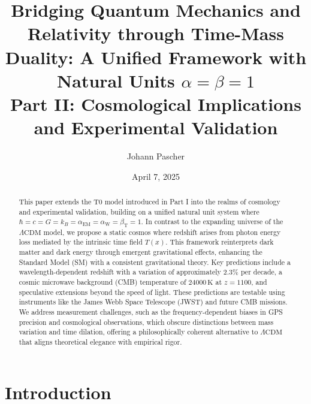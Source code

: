 \documentclass[twocolumn,aps,prl]{revtex4-2}
\newcommand{\Tfield}{T(x)}
\newcommand{\alphaEM}{\alpha_{\text{EM}}}
\newcommand{\alphaW}{\alpha_{\text{W}}}
\newcommand{\betaT}{\beta_{\text{T}}}
\newcommand{\LCDM}{\Lambda\text{CDM}}
\begin{document}
	
	\title{Bridging Quantum Mechanics and Relativity through Time-Mass Duality: A Unified Framework with Natural Units \(\alpha = \beta = 1\) \\ Part II: Cosmological Implications and Experimental Validation}
	\author{Johann Pascher}
	\date{April 7, 2025}
	
	\begin{abstract}
		This paper extends the T0 model introduced in Part I into the realms of cosmology and experimental validation, building on a unified natural unit system where \(\hbar = c = G = k_B = \alphaEM = \alphaW = \betaT = 1\). In contrast to the expanding universe of the \(\LCDM\) model, we propose a static cosmos where redshift arises from photon energy loss mediated by the intrinsic time field \(\Tfield\). This framework reinterprets dark matter and dark energy through emergent gravitational effects, enhancing the Standard Model (SM) with a consistent gravitational theory. Key predictions include a wavelength-dependent redshift with a variation of approximately \(2.3\%\) per decade, a cosmic microwave background (CMB) temperature of \(24000 \, \text{K}\) at \(z = 1100\), and speculative extensions beyond the speed of light. These predictions are testable using instruments like the James Webb Space Telescope (JWST) and future CMB missions. We address measurement challenges, such as the frequency-dependent biases in GPS precision and cosmological observations, which obscure distinctions between mass variation and time dilation, offering a philosophically coherent alternative to \(\LCDM\) that aligns theoretical elegance with empirical rigor.
	\end{abstract}
	
	\maketitle
	
	\section{Introduction}
	\label{sec:introduction}
	
\end{document}
